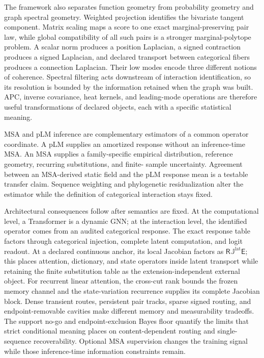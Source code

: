 \documentclass[10pt]{article}
\theoremstyle{definition}
\theoremstyle{remark}
\begin{document}
The framework also separates function geometry from probability geometry and graph spectral
geometry.  Weighted projection identifies the bivariate tangent component.  Matrix scaling maps a
score to one exact marginal-preserving pair law, while global compatibility of all such pairs is a
stronger marginal-polytope problem.  A scalar norm produces a position Laplacian, a signed
contraction produces a signed Laplacian, and declared transport between categorical fibers produces
a connection Laplacian.  Their low modes encode three different notions of coherence.  Spectral
filtering acts downstream of interaction identification, so its resolution is bounded by the
information retained when the graph was built.  APC, inverse covariance, heat kernels, and
leading-mode operations are therefore useful transformations of declared objects, each with a
specific statistical meaning.

MSA and pLM inference are complementary estimators of a common operator coordinate.  A pLM supplies
an amortized response without an inference-time MSA.  An MSA supplies a
family-specific empirical distribution, reference geometry, recurring substitutions, and finite-
sample uncertainty.  Agreement between an MSA-derived static field and the pLM response mean is a
testable transfer claim.  Sequence weighting and phylogenetic residualization alter the estimator
while the definition of categorical interaction stays fixed.

Architectural consequences follow after semantics are fixed.  At the computational level, a
Transformer is a dynamic GNN; at the interaction level, the identified operator comes from an
audited categorical response.  The exact response table factors through categorical injection,
complete latent computation, and logit readout.  At a declared continuous anchor, its local
Jacobian factors as $\mathsf R\mathbb J^{\mathrm{lat}}\mathsf E$; this places attention, dictionary,
and state operators inside latent transport while retaining the finite substitution table as the
extension-independent external object.  For recurrent linear attention, the cross-cut rank bounds
the frozen memory channel and the state-variation recurrence supplies its complete Jacobian block.
Dense transient routes, persistent pair tracks, sparse
signed routing, and endpoint-removable cavities make different memory and measurability tradeoffs.  The
support no-go and endpoint-exclusion Bayes floor quantify the limits that strict conditional meaning places on
content-dependent routing and single-sequence recoverability.  Optional MSA supervision changes
the training signal while those inference-time information constraints remain.
\end{document}
